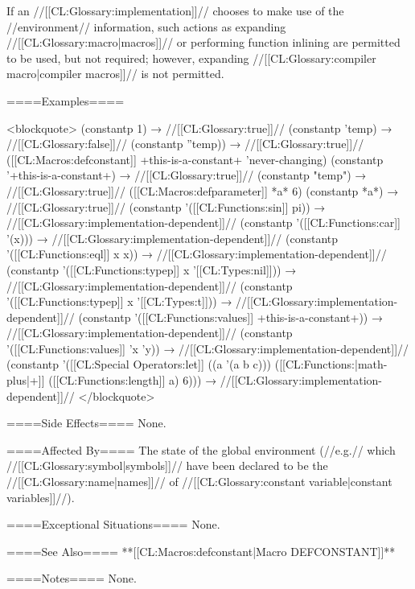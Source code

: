 If an //[[CL:Glossary:implementation]]// chooses to make use of the //environment// information, such actions as expanding //[[CL:Glossary:macro|macros]]// or performing function inlining are permitted to be used, but not required; however, expanding //[[CL:Glossary:compiler macro|compiler macros]]// is not permitted.

====Examples====

<blockquote>
(constantp 1) → //[[CL:Glossary:true]]//
(constantp 'temp) → //[[CL:Glossary:false]]//
(constantp ''temp)) → //[[CL:Glossary:true]]//
([[CL:Macros:defconstant]] +this-is-a-constant+ 'never-changing)
(constantp '+this-is-a-constant+) → //[[CL:Glossary:true]]//
(constantp "temp") → //[[CL:Glossary:true]]//
([[CL:Macros:defparameter]] *a* 6)
(constantp *a*) → //[[CL:Glossary:true]]//
(constantp '([[CL:Functions:sin]] pi)) → //[[CL:Glossary:implementation-dependent]]//
(constantp '([[CL:Functions:car]] '(x))) → //[[CL:Glossary:implementation-dependent]]//
(constantp '([[CL:Functions:eql]] x x)) → //[[CL:Glossary:implementation-dependent]]//
(constantp '([[CL:Functions:typep]] x '[[CL:Types:nil]])) → //[[CL:Glossary:implementation-dependent]]//
(constantp '([[CL:Functions:typep]] x '[[CL:Types:t]])) → //[[CL:Glossary:implementation-dependent]]//
(constantp '([[CL:Functions:values]] +this-is-a-constant+)) → //[[CL:Glossary:implementation-dependent]]//
(constantp '([[CL:Functions:values]] 'x 'y)) → //[[CL:Glossary:implementation-dependent]]//
(constantp '([[CL:Special Operators:let]] ((a '(a b c))) ([[CL:Functions:|math-plus|+]] ([[CL:Functions:length]] a) 6))) → //[[CL:Glossary:implementation-dependent]]//
</blockquote>

====Side Effects====
None.

====Affected By====
The state of the global environment (//e.g.// which //[[CL:Glossary:symbol|symbols]]// have been declared to be the //[[CL:Glossary:name|names]]// of //[[CL:Glossary:constant variable|constant variables]]//).

====Exceptional Situations====
None.

====See Also====
**[[CL:Macros:defconstant|Macro DEFCONSTANT]]**

====Notes====
None.

  
